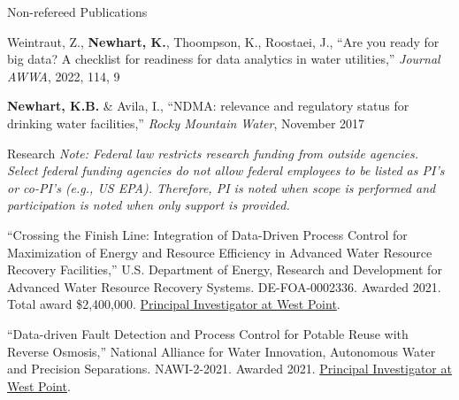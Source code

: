 \documentclass{resume} %
\begin{document}

\begin{rSection}{Non-refereed Publications}

Weintraut, Z., \textbf{Newhart, K.}, Thoompson, K., Roostaei, J., ``Are you ready for big data? A checklist for readiness for data analytics in water utilities,'' \emph{Journal AWWA}, 2022, 114, 9

\textbf{Newhart, K.B.} \& Avila, I., ``NDMA: relevance and regulatory status for drinking water facilities,'' \emph{Rocky Mountain Water}, November 2017

\end{rSection}


\begin{rSection}{Research}
\emph{Note: Federal law restricts research funding from outside agencies. Select federal funding agencies do not allow federal employees to be listed as PI's or co-PI's (e.g., US EPA). Therefore, PI is noted when scope is performed and participation is noted when only support is provided.}

``Crossing the Finish Line: Integration of Data-Driven Process Control for Maximization of Energy and Resource Efficiency in Advanced Water Resource Recovery Facilities,'' U.S. Department of Energy, Research and Development for Advanced Water Resource Recovery Systems. DE-FOA-0002336. Awarded 2021. Total award \$2,400,000. \ul{Principal Investigator at West Point}.

``Data-driven Fault Detection and Process Control for Potable Reuse with Reverse Osmosis,'' National Alliance for Water Innovation, Autonomous Water and Precision Separations. NAWI-2-2021. Awarded 2021. \ul{Principal Investigator at West Point}.
\end{rSection}


\end{document}
